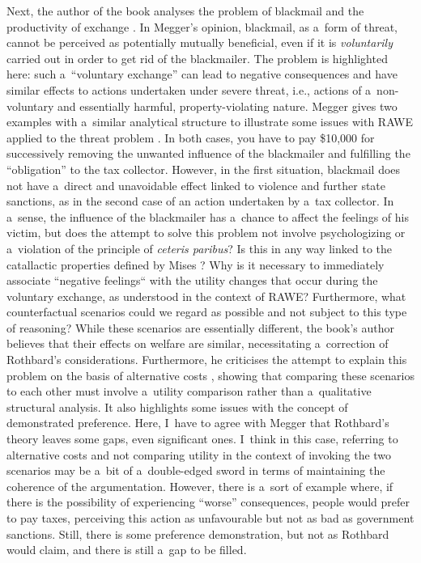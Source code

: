 Next, the author of the book analyses the problem of blackmail and the productivity of exchange 
\parencite[][pp.62–67]{megger_sprawiedliwosc_2021}. %
 In Megger's opinion, blackmail, as a~form of threat, cannot be perceived as potentially mutually beneficial, even if it is \textit{voluntarily} carried out in order to get rid of the blackmailer. The problem is highlighted here: such a~``voluntary exchange'' can lead to negative consequences and have similar effects to actions undertaken under severe threat, i.e., actions of a~non-voluntary and essentially harmful, property-violating nature. Megger gives two examples with a~similar analytical structure to illustrate some issues with RAWE applied to the threat problem 
\parencite[][p.63]{megger_sprawiedliwosc_2021}. %
 In both cases, you have to pay \$10,000 for successively removing the unwanted influence of the blackmailer and fulfilling the ``obligation'' to the tax collector. However, in the first situation, blackmail does not have a~direct and unavoidable effect linked to violence and further state sanctions, as in the second case of an action undertaken by a~tax collector. In a~sense, the influence of the blackmailer has a~chance to affect the feelings of his victim, but does the attempt to solve this problem not involve psychologizing or a~violation of the principle of \textit{ceteris paribus}? Is this in any way linked to the catallactic properties defined by Mises 
\parencite*[][pp.233–257]{mises_human_1998}? %
 Why is it necessary to immediately associate ``negative feelings`` with the utility changes that occur during the voluntary exchange, as understood in the context of RAWE? Furthermore, what counterfactual scenarios could we regard as possible and not subject to this type of reasoning? While these scenarios are essentially different, the book's author believes that their effects on welfare are similar, necessitating a~correction of Rothbard's considerations. Furthermore, he criticises the attempt to explain this problem on the basis of alternative costs 
\parencite[][p.64]{megger_sprawiedliwosc_2021}, %
 showing that comparing these scenarios to each other must involve a~utility comparison rather than a~qualitative structural analysis. It also highlights some issues with the concept of demonstrated preference. Here, I~have to agree with Megger that Rothbard's theory leaves some gaps, even significant ones. I~think in this case, referring to alternative costs and not comparing utility in the context of invoking the two scenarios may be a~bit of a~double-edged sword in terms of maintaining the coherence of the argumentation. However, there is a~sort of example where, if there is the possibility of experiencing ``worse'' consequences, people would prefer to pay taxes, perceiving this action as unfavourable but not as bad as government sanctions. Still, there is some preference demonstration, but not as Rothbard would claim, and there is still a~gap to be filled.



